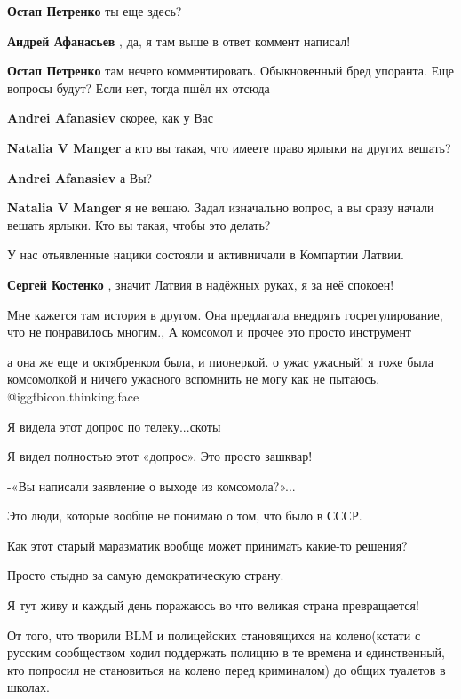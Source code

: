 \begin{itemize}
\begin{itemize}
\textbf{Остап Петренко} ты еще здесь?

\textbf{Андрей Афанасьев} , да, я там выше в ответ коммент написал!

\textbf{Остап Петренко} там нечего комментировать. Обыкновенный бред упоранта. Еще вопросы будут? Если нет, тогда пшёл нх отсюда

\textbf{Andrei Afanasiev} скорее, как у Вас

\textbf{Natalia V Manger} а кто вы такая, что имеете право ярлыки на других вешать?

\textbf{Andrei Afanasiev} а Вы?

\textbf{Natalia V Manger} я не вешаю. Задал изначально вопрос, а вы сразу начали вешать ярлыки. Кто вы такая, чтобы это делать?
\end{itemize} %

У нас отьявленные нацики состояли и активничали в Компартии Латвии.

\textbf{Сергей Костенко} , значит Латвия в надёжных руках, я за неё спокоен!


Мне кажется там история в другом. Она предлагала внедрять госрегулирование, что
не понравилось многим., А комсомол и прочее это просто инструмент


а она же еще и октябренком была, и пионеркой. о ужас ужасный! я тоже была
комсомолкой и ничего ужасного вспомнить не могу как не пытаюсь. @igg{fbicon.thinking.face} 

Я видела этот допрос по телеку...скоты


Я видел полностью этот «допрос». Это просто зашквар!

-«Вы написали заявление о выходе из комсомола?»...

Это люди, которые вообще не понимаю о том, что было в СССР.

Как этот старый маразматик вообще может принимать какие-то решения?

Просто стыдно за самую демократическую страну.

Я тут живу и каждый день поражаюсь во что великая страна превращается!

От того, что творили BLM и полицейских становящихся на колено(кстати с русским
сообществом ходил поддержать полицию в те времена и единственный, кто попросил
не становиться на колено перед криминалом) до общих туалетов в школах.


\end{itemize}
